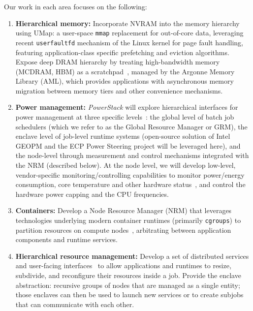 Our work in each area focuses on the following:

\begin{enumerate}

\item \textbf{Hierarchical memory:} Incorporate NVRAM into the memory hierarchy
using UMap: a user-space \texttt{mmap} replacement for out-of-core data,
leveraging recent \texttt{userfaultfd} mechanism of the Linux kernel for page fault
handling, featuring application-class specific prefetching and eviction
algorithms.  Expose deep DRAM hierarchy by treating high-bandwidth memory
(MCDRAM, HBM) as a scratchpad~\cite{perarnau2016exploring}, managed by the Argonne Memory Library (AML),
which provides applications with asynchronous memory migration
between memory tiers and other convenience mechanisms.

\item \textbf{Power management:}
\emph{PowerStack} will explore hierarchical interfaces for power management
at three specific
levels~\cite{Ellsworth:argo,ellsworth_e2sc2016,patki2016,sakamoto2017}: the
global level of batch job schedulers (which we refer to as the Global
Resource Manager or GRM), the enclave level of job-level runtime systems
(open-source solution of Intel GEOPM and the ECP Power Steering project
will be leveraged here), and the node-level through measurement and control
mechanisms integrated with the NRM (described below).
At the node level, we will develop low-level, vendor-specific 
monitoring/controlling capabilities to monitor power/energy consumption,
core temperature and other hardware status~\cite{osti_1353371,zhang2015minimizing}, and control the hardware power
capping and the CPU frequencies. 

\item \textbf{Containers:} Develop a Node Resource Manager (NRM) that leverages
technologies underlying modern container runtimes
(primarily \texttt{cgroups}) to partition resources on compute nodes~\cite{zounmevo2015container},
arbitrating between application components and runtime services.

\item \textbf{Hierarchical resource management:} Develop a set of distributed
services and user-facing interfaces~\cite{perarnau2015distributed} to allow applications and runtimes to
resize, subdivide, and reconfigure their resources inside a job.  Provide
the enclave abstraction: recursive groups of nodes that are managed as a
single entity; those enclaves can then be used to launch new services or to
create subjobs that can communicate with each other.
\end{enumerate}


